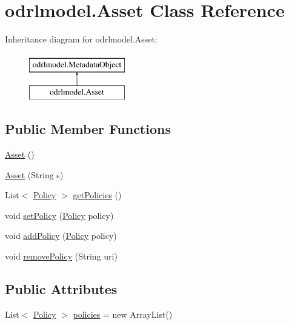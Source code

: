\hypertarget{classodrlmodel_1_1_asset}{\section{odrlmodel.\-Asset Class Reference}
\label{classodrlmodel_1_1_asset}
}
Inheritance diagram for odrlmodel.\-Asset\-:\begin{figure}[H]
\begin{center}
\leavevmode
\includegraphics[height=2.000000cm]{classodrlmodel_1_1_asset}
\end{center}
\end{figure}
\subsection*{Public Member Functions}
\begin{DoxyCompactItemize}
\item 
\hyperlink{classodrlmodel_1_1_asset_a6a77e36bcdfc41e612c3fcaf262fb8c1}{Asset} ()
\item 
\hyperlink{classodrlmodel_1_1_asset_a066f7b7be939762221ad48418df105ee}{Asset} (String s)
\item 
List$<$ \hyperlink{classodrlmodel_1_1_policy}{Policy} $>$ \hyperlink{classodrlmodel_1_1_asset_a8e24d6038216a50ab4263cf74f5e06c3}{get\-Policies} ()
\item 
void \hyperlink{classodrlmodel_1_1_asset_a436208a27951040627229707fbdc9020}{set\-Policy} (\hyperlink{classodrlmodel_1_1_policy}{Policy} policy)
\item 
void \hyperlink{classodrlmodel_1_1_asset_a672387d6310a34ab8494ca3a3f9838d5}{add\-Policy} (\hyperlink{classodrlmodel_1_1_policy}{Policy} policy)
\item 
void \hyperlink{classodrlmodel_1_1_asset_abe1e947ddc4d09cbf4058c78ec468b52}{remove\-Policy} (String uri)
\end{DoxyCompactItemize}
\subsection*{Public Attributes}
\begin{DoxyCompactItemize}
\item 
List$<$ \hyperlink{classodrlmodel_1_1_policy}{Policy} $>$ \hyperlink{classodrlmodel_1_1_asset_a140b2ed540257e126a199ee6982a7d69}{policies} = new Array\-List()
\end{DoxyCompactItemize}
